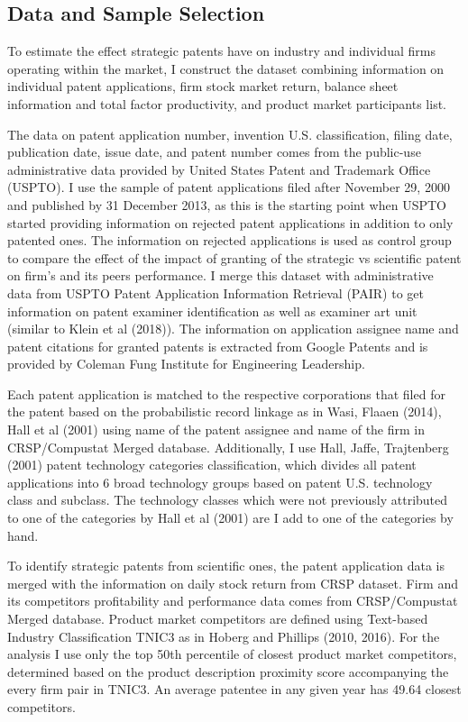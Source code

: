 \documentclass[11pt]{article}
\begin{document}
\subsection{Data and Sample Selection}



To estimate the effect strategic patents have on industry and individual firms operating within
the market, I construct the dataset combining information on individual patent applications, firm
stock market return, balance sheet information and total factor productivity, and product market
participants list.

The data on patent application number, invention U.S. classification, filing date, publication
date, issue date, and patent number comes from the public-use administrative data provided by
United States Patent and Trademark Office (USPTO). I use the sample of patent applications filed
after November 29, 2000 and published by 31 December 2013, as this is the starting point when
USPTO started providing information on rejected patent applications in addition to only patented
ones. The information on rejected applications is used as control group to compare the effect of
the impact of granting of the strategic vs scientific patent on firm's and its peers performance. I
merge this dataset with administrative data from USPTO Patent Application Information Retrieval
(PAIR) to get information on patent examiner identification as well as examiner art unit (similar
to  \color{blue} Klein et al (2018)\color{black}). The information on application assignee name and patent citations for
granted patents is extracted from Google Patents and is provided by Coleman Fung Institute for
Engineering Leadership.

Each patent application is matched to the respective corporations that filed for the patent based
on the probabilistic record linkage as in \color{blue}Wasi, Flaaen (2014), Hall et al (2001) \color{black} using name of the
patent assignee and name of the firm in CRSP/Compustat Merged database. Additionally, I use
\color{blue}Hall, Jaffe, Trajtenberg (2001) \color{black}patent technology categories classification, which divides all patent
applications into 6 broad technology groups based on patent U.S. technology class and subclass.
The technology classes which were not previously attributed to one of the categories by \color{blue}Hall et al
(2001) \color{black} are I add to one of the categories by hand.

To identify strategic patents from scientific ones, the patent application data is merged with the
information on daily stock return from CRSP dataset. Firm and its competitors profitability and
performance data comes from CRSP/Compustat Merged database. Product market competitors
are defined using Text-based Industry Classification TNIC3 as in \color{blue}Hoberg and Phillips (2010, 2016)\color{black}.
For the analysis I use only the top 50th percentile of closest product market competitors, determined
based on the product description proximity score accompanying the every firm pair in TNIC3. An
average patentee in any given year has 49.64 closest competitors.
\end{document}
